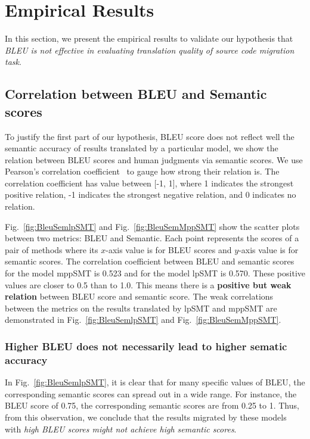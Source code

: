 \section{Empirical Results}
\label{sec:bleuresult}

In this section, we present the empirical results to validate our hypothesis that
\textit{BLEU is not effective in evaluating translation quality of source code migration task}.
\subsection{Correlation between BLEU and Semantic scores}
To justify the first part of our hypothesis, BLEU score does not reflect well
the semantic accuracy of results translated by a particular model,
we show the relation between BLEU scores and human judgments via semantic scores.
We use Pearson's correlation coefficient~\cite{PearsonCorrelation} to gauge
how strong their relation is. The correlation coefficient has value
between [-1, 1], where 1 indicates the strongest positive relation, -1
indicates the strongest negative relation, and 0 indicates no relation.

Fig.~\ref{fig:BleuSemlpSMT} and Fig.~\ref{fig:BleuSemMppSMT} show the
scatter plots between two metrics: BLEU and Semantic. Each point
represents the scores of a pair of methods where its $x$-axis value is
for BLEU scores and $y$-axis value is for semantic scores. The
correlation coefficient between BLEU and semantic scores for the model
mppSMT is 0.523 and for the model lpSMT is 0.570. These positive values
are closer to 0.5 than to 1.0. This means there is a {\bf positive but weak
relation} between BLEU score and semantic score. The weak correlations %
between the metrics on the results translated by lpSMT and mppSMT are
demonstrated in Fig.~\ref{fig:BleuSemlpSMT} and Fig.~\ref{fig:BleuSemMppSMT}.


\subsubsection{{\bf Higher BLEU does not necessarily lead to higher
sematic accuracy}}

In Fig.~\ref{fig:BleuSemlpSMT}, it is clear that for many specific
values of BLEU, the corresponding semantic scores can spread out in a
wide range. For instance, the BLEU score of 0.75, the corresponding
semantic scores are from 0.25 to 1.
Thus, from this observation, we conclude that the results migrated by
these models with {\em high BLEU scores might not achieve high semantic
scores}.
%


